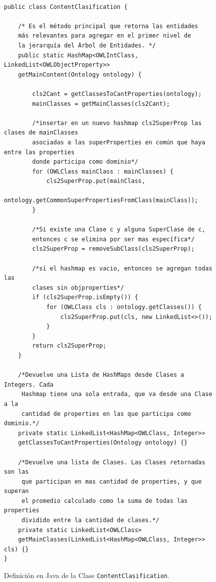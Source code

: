 \begin{figure}
\begin{verbatim}

public class ContentClasification {

    /* Es el método principal que retorna las entidades
    más relevantes para agregar en el primer nivel de
    la jerarquía del Árbol de Entidades. */
    public static HashMap<OWLIntClass, LinkedList<OWLObjectProperty>>
    getMainContent(Ontology ontology) {
        
        cls2Cant = getClassesToCantProperties(ontology);
        mainClasses = getMainClasses(cls2Cant);

        /*insertar en un nuevo hashmap cls2SuperProp las clases de mainClasses
        asociadas a las superProperties en común que haya entre las properties 
        donde participa como dominio*/
        for (OWLClass mainClass : mainClasses) {
            cls2SuperProp.put(mainClass,
            ontology.getCommonSuperPropertiesFromClass(mainClass));
        }
        
        /*Si existe una Clase c y alguna SuperClase de c, 
        entonces c se elimina por ser mas específica*/
        cls2SuperProp = removeSubClass(cls2SuperProp);

        /*si el hashmap es vacio, entonces se agregan todas las
        clases sin objproperties*/
        if (cls2SuperProp.isEmpty()) {
            for (OWLClass cls : ontology.getClasses()) {
                cls2SuperProp.put(cls, new LinkedList<>());
            }
        }
        return cls2SuperProp;
    }
    
    /*Devuelve una Lista de HashMaps desde Clases a Integers. Cada
     Hashmap tiene una sola entrada, que va desde una Clase a la
     cantidad de properties en las que participa como dominio.*/
    private static LinkedList<HashMap<OWLClass, Integer>>
    getClassesToCantProperties(Ontology ontology) {}
    
    /*Devuelve una lista de Clases. Las Clases retornadas son las
     que participan en mas cantidad de properties, y que superan 
     el promedio calculado como la suma de todas las properties
     dividido entre la cantidad de clases.*/
    private static LinkedList<OWLClass>
    getMainClasses(LinkedList<HashMap<OWLClass, Integer>> cls) {}
}

\end{verbatim}
\caption{Definición en Java de la Clase \texttt{ContentClasification}.}
\label{fig:clase_content_clasif}
\end{figure}


